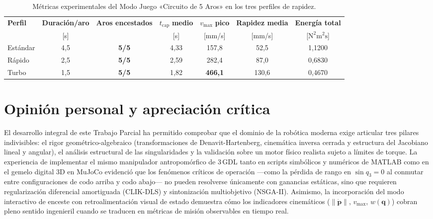 \documentclass[11pt,a4paper]{article}
\newcommand{\norm}[1]{\left\lVert#1\right\rVert}
\newcommand{\pdot}{\dot{\bm{p}}}
\begin{document}
\begin{table}[htbp]
\centering
\caption{Métricas experimentales del Modo Juego «Circuito de 5 Aros» en los tres perfiles de rapidez.}\label{tab:aros}
\footnotesize
\setlength{\tabcolsep}{5pt}
\begin{tabular}{lcccccc}
\toprule
\textbf{Perfil} & \textbf{Duración/aro} & \textbf{Aros encestados} & $t_{\text{cap}}$ \textbf{medio} & $v_{\max}$ \textbf{pico} & \textbf{Rapidez media} & \textbf{Energía total} \\
 & {[s]} & & {[s]} & {[mm/s]} & {[mm/s]} & {[$\text{N}^{2}\text{m}^{2}\text{s}$]} \\
\midrule
Estándar & 4{,}5 & \textbf{5/5} & 4{,}33 & 157{,}8 &  52{,}5 & 1{,}1200 \\
Rápido   & 2{,}5 & \textbf{5/5} & 2{,}59 & 282{,}4 &  87{,}0 & 0{,}6830 \\
Turbo    & 1{,}5 & \textbf{5/5} & 1{,}82 & \textbf{466{,}1} & 130{,}6 & 0{,}4670 \\
\bottomrule
\end{tabular}
\end{table}

\section{Opinión personal y apreciación crítica}

El desarrollo integral de este Trabajo Parcial ha permitido comprobar que el dominio de la robótica moderna exige articular tres pilares indivisibles: el rigor geométrico-algebraico (transformaciones de Denavit-Hartenberg, cinemática inversa cerrada y estructura del Jacobiano lineal y angular), el análisis estructural de las singularidades y la validación sobre un motor físico realista sujeto a límites de torque. La experiencia de implementar el mismo manipulador antropomórfico de 3\,GDL tanto en scripts simbólicos y numéricos de MATLAB como en el gemelo digital 3D en MuJoCo evidenció que los fenómenos críticos de operación ---como la pérdida de rango en $\sin q_{3}=0$ al conmutar entre configuraciones de codo arriba y codo abajo--- no pueden resolverse únicamente con ganancias estáticas, sino que requieren regularización diferencial amortiguada (CLIK-DLS) y sintonización multiobjetivo (NSGA-II). Asimismo, la incorporación del modo interactivo de enceste con retroalimentación visual de estado demuestra cómo los indicadores cinemáticos ($\norm{\pdot}$, $v_{\max}$, $w(\bm{q})$) cobran pleno sentido ingenieril cuando se traducen en métricas de misión observables en tiempo real.
\end{document}
